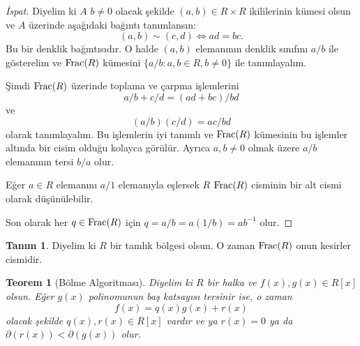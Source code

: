 \documentclass{article}
\newtheorem{thm}{Teorem}[section]
\theoremstyle{definition}
\newtheorem{defn}{Tanım}[section]
\theoremstyle{remark}
\begin{document}
		    \begin{proof}[İspat]
		        Diyelim ki $A$ $b \neq 0$ olacak şekilde $(a, b) \in R \times R$ ikililerinin kümesi olsun ve $A$ üzerinde aşağıdaki bağıntı tanımlansın:
		        \begin{equation*}
		            (a, b) \sim (c, d) \iff ad = bc.
		        \end{equation*}
		        Bu bir denklik bağıntısıdır. O halde $(a, b)$ elemanının denklik sınıfını $a/b$ ile gösterelim ve $\textup{Frac}(R)$ kümesini $\{a/b : a, b \in R, b \neq 0\}$ ile tanımlayalım.\par
		        Şimdi $\textup{Frac}(R)$ üzerinde toplama ve çarpma işlemlerini
		        \begin{equation*}
		            a/b + c/d = (ad + bc)/bd
		        \end{equation*}
		        ve
		        \begin{equation*}
		            (a/b)(c/d) = ac/bd
		        \end{equation*}
		        olarak tanımlayalım. Bu işlemlerin iyi tanımlı ve $\textup{Frac}(R)$ kümesinin bu işlemler altında bir cisim olduğu kolayca görülür. Ayrıca $a, b \neq 0$ olmak üzere $a/b$ elemanının tersi $b/a$ olur.\par
		        Eğer $a \in R$ elemanını $a/1$ elemanıyla eşlersek $R$ $\textup{Frac}(R)$ cisminin bir alt cismi olarak düşünülebilir.\par
		        Son olarak her $q \in \textup{Frac}(R)$ için $q = a/b = a(1/b) = ab^{-1}$ olur.
		    \end{proof}
		    
		    \begin{defn}
		        Diyelim ki $R$ bir tamlık bölgesi olsun. O zaman $\textup{Frac}(R)$ onun kesirler cismidir.
		    \end{defn}
		    
		    \begin{thm}[Bölme Algoritması]
		        Diyelim ki $R$ bir halka ve $f(x), g(x) \in R[x]$ olsun. Eğer $g(x)$ polinomunun baş katsayısı tersinir ise, o zaman
		        \begin{equation*}
		            f(x) = q(x)g(x) + r(x)
		        \end{equation*}
		        olacak şekilde $q(x), r(x) \in R[x]$ vardır ve ya $r(x) = 0$ ya da $\partial(r(x)) < \partial(g(x))$ olur.
    		\end{thm}
    		
\end{document}
